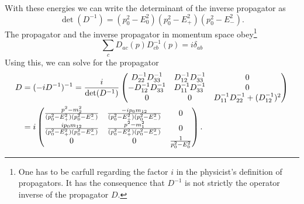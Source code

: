 With these energies we can write the determinant of the inverse propagator as
\begin{equation}
    \det(D^{-1}) = (p_0^2 - E_0^2) (p_0^2 - E_+^2) (p_0^2 - E_-^2).
\end{equation}
The propagator and the inverse propagator in momentum space obey\footnote{One has to be carfull regarding the factor $i$ in the physicist's definition of propagators. It has the consequence that $D^{-1}$ is not strictly the operator inverse of the propagator $D$.}
\begin{equation}
    \sum_c D_{ac}(p)D_{cb}^{-1}(p) = i \delta_{ab}
\end{equation}
Using this, we can solve for the propagator
\begin{align}
    \notag
    D & = (- iD^{-1})^{-1} = \frac{i}{\det(D^{-1})}
    \begin{pmatrix}
        D^{-1}_{22} D^{-1}_{33}   & D^{-1}_{12}D^{-1}_{33}  & 0 \\
        -D^{-1}_{12}D^{-1}_{33}   & D^{-1}_{11}D^{-1}_{33}  & 0 \\
        0               & 0             & D^{-1}_{11}D^{-1}_{22} + (D^{-1}_{12})^2
    \end{pmatrix} \\
    \label{free pion propagator}
    & = i
    \begin{pmatrix}
        \frac{
            p^2 - m_2^2
        }
        {
            (p_0^2 - E_+^2)(p_0^2 - E_-^2)
        } 
        & \frac{
            - ip_0m_{12}
        }
        {
            (p_0^2 - E_+^2)(p_0^2 - E_-^2)
        } & 0 \\
        \frac{
            ip_0m_{12}
        }
        {
            (p_0^2 - E_+^2)(p_0^2 - E_-^2)
        }
        & \frac{
            p^2 - m_1^2
        }
        {
            (p_0^2 - E_+^2)(p_0^2 - E_-^2)
        } & 0 \\
        0 & 0 & 
        \frac{1}{p_0^2 - E_0^2}
    \end{pmatrix}.
\end{align}
